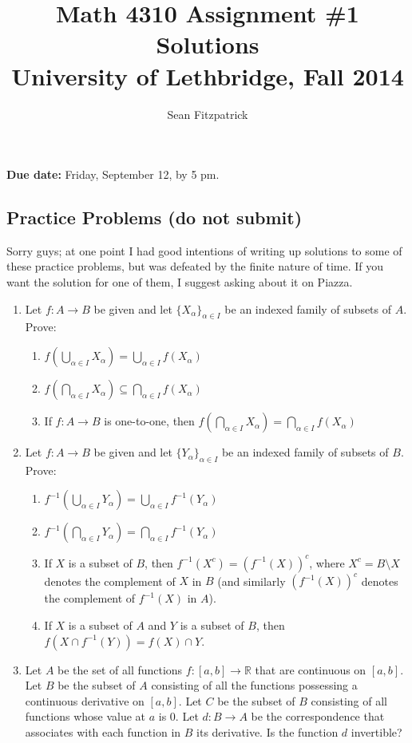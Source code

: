 \documentclass[letterpaper,12pt]{article}
\title{Math 4310 Assignment \#1 Solutions\\University of Lethbridge, Fall 2014}
\author{Sean Fitzpatrick}
\newcommand{\R}{\mathbb{R}}
\begin{document}
 \maketitle

{\bf Due date:} Friday, September 12, by 5 pm.

\bigskip

\subsection*{Practice Problems (do not submit)}
Sorry guys; at one point I had good intentions of writing up solutions to some of these practice problems, but was defeated by the finite nature of time. If you want the solution for one of them, I suggest asking about it on Piazza.

\begin{enumerate}
 \item Let $f:A\to B$ be given and let $\{X_\alpha\}_{\alpha\in I}$ be an indexed family of subsets of $A$. Prove:
\begin{enumerate}
 \item $f(\bigcup_{\alpha\in I}X_\alpha) = \bigcup_{\alpha\in I}f(X_\alpha)$
 \item $f(\bigcap_{\alpha\in I} X_\alpha)\subseteq \bigcap_{\alpha\in I}f(X_\alpha)$ 
 \item If $f:A\to B$ is one-to-one, then $f(\bigcap_{\alpha\in I} X_\alpha)= \bigcap_{\alpha\in I}f(X_\alpha)$
\end{enumerate}
 \item Let $f:A\to B$ be given and let $\{Y_\alpha\}_{\alpha\in I}$ be an indexed family of subsets of $B$. Prove:
\begin{enumerate}
 \item $f^{-1}(\bigcup_{\alpha\in I} Y_\alpha) = \bigcup_{\alpha\in I} f^{-1}(Y_{\alpha})$
 \item $f^{-1}(\bigcap_{\alpha\in I}Y_\alpha) = \bigcap_{\alpha\in I}f^{-1}(Y_\alpha)$
 \item If $X$ is a subset of $B$, then $f^{-1}(X^c) = (f^{-1}(X))^c$, where $X^c = B\setminus X$ denotes the complement of $X$ in $B$ (and similarly $(f^{-1}(X))^c$ denotes the complement of $f^{-1}(X)$ in $A$).
 \item If $X$ is a subset of $A$ and $Y$ is a subset of $B$, then $f(X\cap f^{-1}(Y)) = f(X)\cap Y$.
\end{enumerate}
 \item Let $A$ be the set of all functions $f:[a,b]\to\R$ that are continuous on $[a,b]$. Let $B$ be the subset of $A$ consisting of all the functions possessing a continuous derivative on $[a,b]$. Let $C$ be the subset of $B$ consisting of all functions whose value at $a$ is 0. Let $d:B\to A$ be the correspondence that associates with each function in $B$ its derivative. Is the function $d$ invertible?


\end{enumerate}
\end{document}
